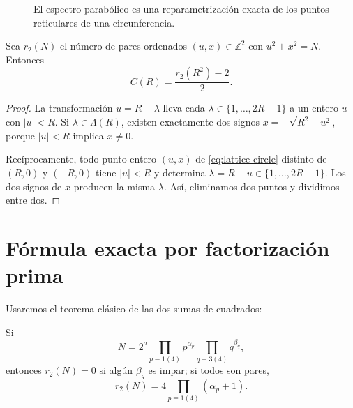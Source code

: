 \documentclass[11pt,a4paper,openany]{report}
\newcommand{\Z}{\mathbb{Z}}
\newcommand{\Lam}{\Lambda}
\begin{document}
\begin{figure}[H]
\centering
{}
\caption{El espectro parabólico es una reparametrización exacta de los puntos reticulares de una circunferencia.}
\label{fig:bijection}
\end{figure}

\begin{theorem}
Sea \(r_2(N)\) el número de pares ordenados \((u,x)\in\Z^2\) con \(u^2+x^2=N\). Entonces
\begin{equation}
 \boxed{C(R)=\frac{r_2(R^2)-2}{2}.}
 \label{eq:C-r2}
\end{equation}
\end{theorem}

\begin{proof}
La transformación \(u=R-\lambda\) lleva cada \(\lambda\in\{1,\ldots,2R-1\}\) a un entero \(u\) con \(|u|<R\). Si \(\lambda\in\Lam(R)\), existen exactamente dos signos \(x=\pm\sqrt{R^2-u^2}\), porque \(|u|<R\) implica \(x\ne0\).

Recíprocamente, todo punto entero \((u,x)\) de \eqref{eq:lattice-circle} distinto de \((R,0)\) y \((-R,0)\) tiene \(|u|<R\) y determina \(\lambda=R-u\in\{1,\ldots,2R-1\}\). Los dos signos de \(x\) producen la misma \(\lambda\). Así, eliminamos dos puntos y dividimos entre dos.
\end{proof}

\section{Fórmula exacta por factorización prima}

Usaremos el teorema clásico de las dos sumas de cuadrados:

\begin{theorem}
Si
\[
 N=2^a\prod_{p\equiv1(4)}p^{\alpha_p}
       \prod_{q\equiv3(4)}q^{\beta_q},
\]
entonces \(r_2(N)=0\) si algún \(\beta_q\) es impar; si todos son pares,
\[
 r_2(N)=4\prod_{p\equiv1(4)}(\alpha_p+1).
\]
\end{theorem}
\end{document}
